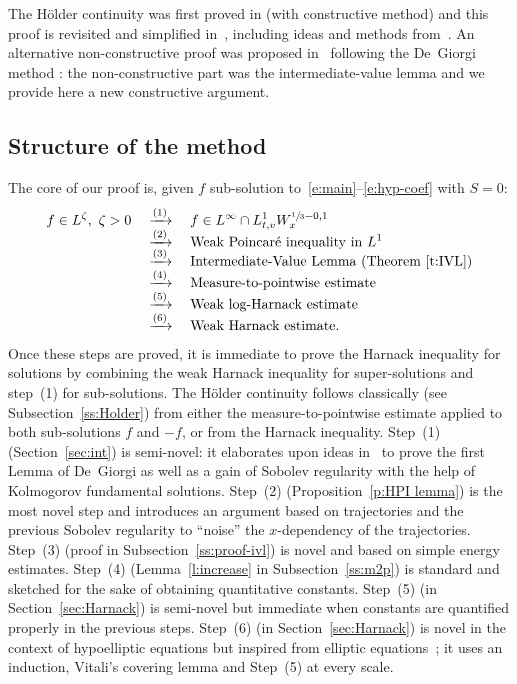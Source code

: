 \begin{remark}
The Hölder continuity was first proved in \cite{wz09,wz11}
(with constructive method) and this proof is revisited and
simplified in~\cite{Guerand-Imbert}, including ideas and
methods from~\cite{moser,kru63,kru64}. An alternative
non-constructive proof was proposed in~\cite{gimv} following
the De~Giorgi method \cite{DG56}: the non-constructive part was
the intermediate-value lemma and we provide here a new
constructive argument.
\end{remark}

\subsection{Structure of the method}

The core of our proof is, given $f$ sub-solution
to~\eqref{e:main}--\eqref{e:hyp-coef} with $S=0$:\vspace*{-5pt}\enlargethispage{.5\baselineskip}%
\begin{align*}
f \in L^\zeta, \ \zeta >0
& \quad \xrightarrow{(1)}
\quad f \in L^\infty \cap L^1_{t,v}W^{\sfrac13-0,1}_x \\[-5pt]
& \quad \xrightarrow{(2)} \quad
\text{Weak Poincaré inequality in $L^1$} \\[-5pt]
& \quad \xrightarrow{(3)}
\quad \text{Intermediate-Value Lemma (Theorem~\ref{t:IVL}})\\[-5pt]
& \quad \xrightarrow{(4)}
\quad \text{Measure-to-pointwise estimate} \\[-5pt]
& \quad \xrightarrow{(5)} \quad \text{Weak log-Harnack
estimate} \\[-5pt]
& \quad \xrightarrow{(6)}
\quad \text{Weak Harnack estimate.}
\end{align*}
Once these steps are proved, it is immediate to prove the Harnack
inequality for solutions by combining the weak Harnack inequality
for super-solutions and step~(1) for sub-solutions. The Hölder
continuity follows classically (see Subsection~\ref{ss:Holder})
from either the measure-to-pointwise estimate applied to both
sub-solutions $f$ and $-f$, or from the Harnack inequality.
Step~(1) (Section~\ref{sec:int}) is semi-novel: it elaborates
upon ideas in~\cite{pp} to prove the first Lemma of De~Giorgi as
well as a gain of Sobolev regularity with the help of Kolmogorov
fundamental solutions. Step~(2) (Proposition~\ref{p:HPI lemma})
is the most novel step and introduces an argument based on
trajectories and the previous Sobolev regularity to ``noise'' the
$x$-dependency of the trajectories. Step~(3) (proof in
Subsection~\ref{ss:proof-ivl}) is novel and based on simple
energy estimates. Step~(4) (Lemma~\ref{l:increase} in
Subsection~\ref{ss:m2p}) is standard and sketched for the sake of
obtaining quantitative constants. Step~(5) (in
Section~\ref{sec:Harnack}) is semi-novel but immediate when
constants are quantified properly in the previous steps. Step~(6)
(in Section~\ref{sec:Harnack}) is novel in the context of
hypoelliptic equations but inspired from elliptic
equations~\cite{MR3565366}; it uses an induction, Vitali's
covering lemma and Step~(5) at every scale.

